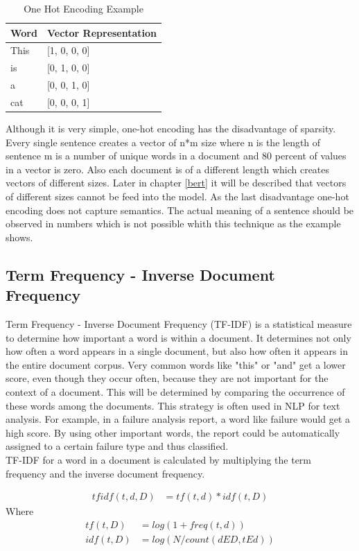 \begin{table}[H]
	\centering
	\begin{tabular}{ll}
		\hline
		\textbf{Word} & \textbf{Vector Representation} \\ \hline
		This & [1, 0, 0, 0]\\ 
		is    & [0, 1, 0, 0]\\ 
		a & [0, 0, 1, 0]\\ 
		cat  & [0, 0, 0, 1]\\ \hline
	\end{tabular}
	\caption{One Hot Encoding Example}
	\label{tab:onehot}
\end{table}

Although it is very simple, one-hot encoding has the disadvantage of sparsity. Every single sentence creates a vector of n*m size where n is the length of sentence m is a number of unique words in a document and 80 percent of values in a vector is zero. Also each document is of a different length which creates vectors of different sizes. Later in chapter \ref{bert} it will be described that vectors of different sizes cannot be feed into the model.
As the last disadvantage one-hot encoding does not capture semantics. The actual meaning of a sentence should be observed in numbers which is not possible whith this technique as the example shows.

\subsection{Term Frequency - Inverse Document Frequency}
Term Frequency - Inverse Document Frequency (TF-IDF) is a statistical measure to determine how important a word is within a document. It determines not only how often a word appears in a single document, but also how often it appears in the entire document corpus. Very common words like "this" or "and" get a lower score, even though they occur often, because they are not important for the context of a document. This will be determined by comparing the occurrence of these words among the documents. This strategy is often used in NLP for text analysis. For example, in a failure analysis report, a word like failure would get a high score. By using other important words, the report could be automatically assigned to a certain failure type and thus classified. \\
TF-IDF for a word in a document is calculated by multiplying the term frequency and the inverse document frequency.

\begin{align}
	tf idf (t, d, D) &= tf(t, d) * idf(t, D)
\end{align}
Where
\begin{align}
	tf (t, D) &= log(1 + freq(t, d)) \\
	idf(t, D) &= log(N/count(d E D, t E d))
\end{align}

